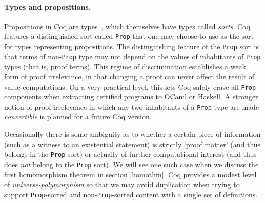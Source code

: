 \documentclass[a4paper,10pt,runningheads]{llncs}
\begin{document}
\paragraph{Types and propositions.}

Propositions in Coq are types~\cite{ITT,CMCP}, which themselves have types called \emph{sorts}. Coq features a distinguished sort called \lstinline|Prop| that one may choose to use as the sort for types representing propositions. The distinguishing feature of the \lstinline|Prop| sort is that terms of non-\lstinline|Prop| type may not depend on the values of inhabitants of \lstinline|Prop| types (that is, proof terms).
This regime of discrimination establishes a weak form of proof irrelevance, in that changing a proof can never affect the result of value computations. On a very practical level, this lets Coq safely erase all \lstinline|Prop| components when extracting certified programs to OCaml or Haskell.
A stronger notion of proof irrelevance in which any two inhabitants of a \lstinline|Prop| type are made \emph{convertible} is planned for a future Coq version.

Occasionally there is some ambiguity as to whether a certain piece of information (such as a witness to an existential statement) is strictly `proof matter' (and thus belongs in the \lstinline|Prop| sort) or actually of further computational interest (and thus does \emph{not} belong to the \lstinline|Prop| sort). We will see one such case when we discuss the first homomorphism theorem in section \ref{homothm}. Coq provides a modest level of \emph{universe-polymorphism} so that we may avoid duplication when trying to support \lstinline|Prop|-sorted and non-\lstinline|Prop|-sorted content with a single set of definitions.
\end{document}
